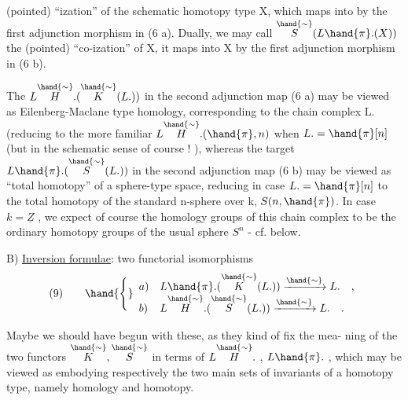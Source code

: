 
(pointed) ``ization'' of the schematic homotopy type X, 
 which maps into 
 by the first adjunction morphism in (6 a). Dually, we may call
$\overset{\hand{\sim}}{S}(L\hand{\pi}.(X))$ the (pointed) ``co-ization'' of X, it maps into X by the
first adjunction morphism in (6 b).

The  $L\overset{\hand{\sim}}{H}.(\overset{\hand{\sim}}{K}(L.))$ in the second adjunction map (6 a)
may be viewed as Eilenberg-Maclane type  homology, corresponding to the
chain complex L. \hand{,} (reducing to the  more familiar $L\overset{\hand{\sim}}{H}.(\hand{\pi},n)$
when $L. =\hand{\pi}[n]$\unsure{\hand{)}} (but in the schematic sense of course ! ), whereas
the target $L\hand{\pi}.(\overset{\hand{\sim}}{S}(L.))$ in the second adjunction map (6 b) may be viewed
as ``total homotopy'' of a sphere-type space, reducing \xout{(}in case $L. =\hand{\pi}[n]$\xout{)}
to the total homotopy of the standard n-sphere over k, $S(n,\hand{\pi})$. In case
$k=\underline{Z}$ , we expect of course  the homology groups of this chain
complex to be the ordinary homotopy groups of the usual sphere $S^n$ -
cf.  below.

B) \uline{Inversion formulae}: two functorial isomorphisms
\[
(9)\qquad \hand{\Bigg\{}\begin{array}{ll}
a) & L\hand{\pi}.(\overset{\hand{\sim}}{K}(L.)) \xrightarrow{\hand{\sim}} L. \quad , \\
b) & L\overset{\hand{\sim}}{H}.(\overset{\hand{\sim}}{S}(L.)) \xrightarrow{\hand{\sim}} L. \quad .
\end{array}
\]

Maybe we should have begun with these, as they kind of fix the mea-%
ning of the two functors $\overset{\hand{\sim}}{K},\overset{\hand{\sim}}{S}$ in terms of $L\overset{\hand{\sim}}{H}.$ , $L\hand{\pi}.$ , which may be
viewed as embodying respectively the two main sets of invariants of a
homotopy type, namely homology and homotopy.

